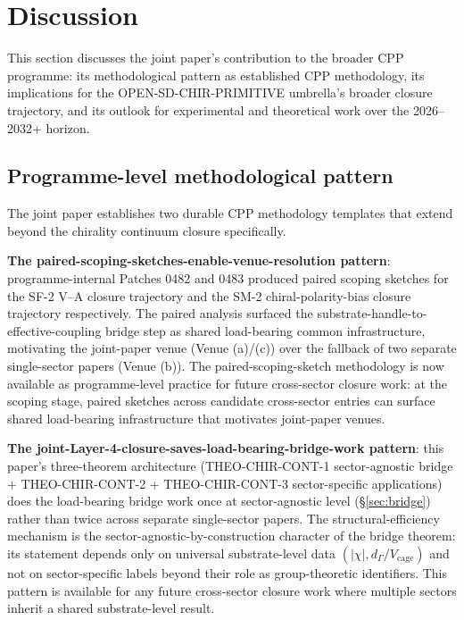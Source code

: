 \documentclass[11pt,letterpaper]{article}
\newcommand{\Vcage}{V_{\text{cage}}}
\newcommand{\dGamma}{d_\Gamma}
\begin{document}
\section{Discussion}
\label{sec:discussion}

This section discusses the joint paper's contribution to the broader CPP programme: its methodological pattern as established CPP methodology, its implications for the OPEN-SD-CHIR-PRIMITIVE umbrella's broader closure trajectory, and its outlook for experimental and theoretical work over the 2026--2032+ horizon.

\subsection{Programme-level methodological pattern}
\label{sec:programme_methodology}

The joint paper establishes two durable CPP methodology templates that extend beyond the chirality continuum closure specifically.

\textbf{The paired-scoping-sketches-enable-venue-resolution pattern}: programme-internal Patches 0482 and 0483 produced paired scoping sketches for the SF-2 V--A closure trajectory and the SM-2 chiral-polarity-bias closure trajectory respectively. The paired analysis surfaced the substrate-handle-to-effective-coupling bridge step as shared load-bearing common infrastructure, motivating the joint-paper venue (Venue (a)/(c)) over the fallback of two separate single-sector papers (Venue (b)). The paired-scoping-sketch methodology is now available as programme-level practice for future cross-sector closure work: at the scoping stage, paired sketches across candidate cross-sector entries can surface shared load-bearing infrastructure that motivates joint-paper venues.

\textbf{The joint-Layer-4-closure-saves-load-bearing-bridge-work pattern}: this paper's three-theorem architecture (THEO-CHIR-CONT-1 sector-agnostic bridge + THEO-CHIR-CONT-2 + THEO-CHIR-CONT-3 sector-specific applications) does the load-bearing bridge work once at sector-agnostic level (§\ref{sec:bridge}) rather than twice across separate single-sector papers. The structural-efficiency mechanism is the sector-agnostic-by-construction character of the bridge theorem: its statement depends only on universal substrate-level data $(|\chi|, \dGamma/\Vcage)$ and not on sector-specific labels beyond their role as group-theoretic identifiers. This pattern is available for any future cross-sector closure work where multiple sectors inherit a shared substrate-level result.
\end{document}
